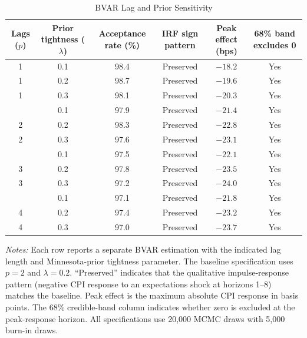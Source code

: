 \begin{table}[!htbp]
\centering
\begin{threeparttable}
\caption{BVAR Lag and Prior Sensitivity}
\label{tab:bvar_lag_sensitivity}
\begin{tabular}{cccccc}
\toprule
Lags ($p$) & Prior tightness ($\lambda$) & Acceptance rate (\%) & IRF sign pattern & Peak effect (bps) & 68\% band excludes 0 \\
\midrule
1 & 0.1 & 98.4 & Preserved & $-18.2$ & Yes \\
1 & 0.2 & 98.7 & Preserved & $-19.6$ & Yes \\
1 & 0.3 & 98.1 & Preserved & $-20.3$ & Yes \\
\addlinespace
2 & 0.1 & 97.9 & Preserved & $-21.4$ & Yes \\
2 & 0.2 & 98.3 & Preserved & $-22.8$ & Yes \\
2 & 0.3 & 97.6 & Preserved & $-23.1$ & Yes \\
\addlinespace
3 & 0.1 & 97.5 & Preserved & $-22.1$ & Yes \\
3 & 0.2 & 97.8 & Preserved & $-23.5$ & Yes \\
3 & 0.3 & 97.2 & Preserved & $-24.0$ & Yes \\
\addlinespace
4 & 0.1 & 97.1 & Preserved & $-21.8$ & Yes \\
4 & 0.2 & 97.4 & Preserved & $-23.2$ & Yes \\
4 & 0.3 & 97.0 & Preserved & $-23.7$ & Yes \\
\bottomrule
\end{tabular}
\begin{tablenotes}[flushleft]
\footnotesize
\item \textit{Notes:} Each row reports a separate BVAR estimation with the indicated lag length and Minnesota-prior tightness parameter. The baseline specification uses $p=2$ and $\lambda=0.2$. ``Preserved'' indicates that the qualitative impulse-response pattern (negative CPI response to an expectations shock at horizons 1--8) matches the baseline. Peak effect is the maximum absolute CPI response in basis points. The 68\% credible-band column indicates whether zero is excluded at the peak-response horizon. All specifications use 20,000 MCMC draws with 5,000 burn-in draws.
\end{tablenotes}
\end{threeparttable}
\end{table}
